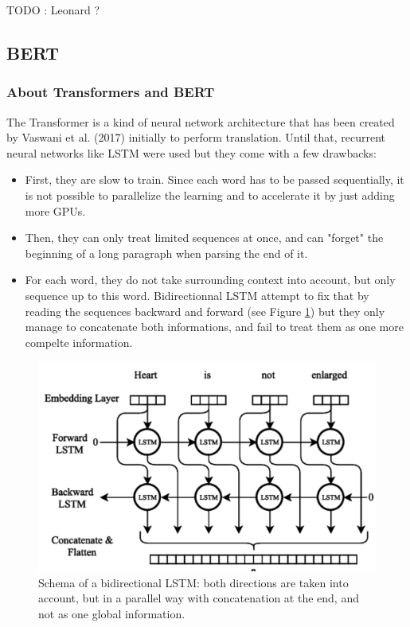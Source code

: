 \documentclass[11pt]{scrartcl}
\begin{document}
TODO : Leonard ?

\subsection{BERT}

\subsubsection{About Transformers and BERT}
The Transformer is a kind of neural network architecture that has been created by Vaswani et al. (2017)\cite{vaswani2017attention} initially to perform translation. Until that, recurrent neural networks like LSTM were used but they come with a few drawbacks: \label{lstm-drawbacks}
\begin{itemize}
    \item First, they are slow to train. Since each word has to be passed sequentially, it is not possible to parallelize the learning and to accelerate it by just adding more GPUs.
    \item Then, they can only treat limited sequences at once, and can "forget" the beginning of a long paragraph when parsing the end of it.
    \item For each word, they do not take surrounding context into account, but only sequence up to this word. Bidirectionnal LSTM attempt to fix that by reading the sequences backward and forward (see Figure \ref{fig:bilstm}) but they only manage to concatenate both informations, and fail to treat them as one more compelte information.
\end{itemize}

\begin{figure}[H]
    \centering
    \includegraphics[width=12cm]{img/BiLSTM.png}
    \caption{Schema of a bidirectional LSTM: both directions are taken into account, but in a parallel way with concatenation at the end, and not as one global information.}
    \label{fig:bilstm}
\end{figure}
\end{document}
